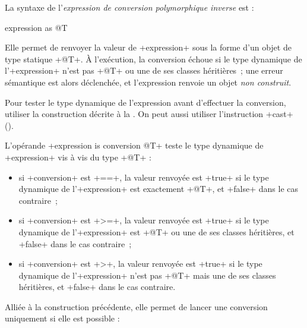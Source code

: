 
La syntaxe de l'\emph{expression de conversion polymorphique inverse} est :

\begin{galgas3box}
expression as @T
\end{galgas3box}

Elle permet de renvoyer la valeur de \ggst+expression+ sous la forme d'un objet de type statique \ggst+@T+. À l'exécution, la conversion échoue si le type dynamique de l'\ggst+expression+ n'est pas \ggst+@T+ ou une de ses classes héritières~; une erreur sémantique est alors déclenchée, et l'expression renvoie un objet \emph{non construit}.

Pour tester le type dynamique de l'expression avant d'effectuer la conversion, utiliser la construction décrite à la . On peut aussi utiliser l'instruction \ggst+cast+ ().








L'opérande \ggst+expression is conversion @T+ teste le type dynamique de \ggst+expression+ vis à vis du type \ggst+@T+ :
\begin{itemize}
\item si \ggst+conversion+ est \ggst+==+, la valeur renvoyée est \ggst+true+ si le type dynamique de l'\ggst+expression+ est exactement \ggst+@T+, et \ggst+false+ dans le cas contraire~;
\item si \ggst+conversion+ est  \ggst+>=+, la valeur renvoyée est \ggst+true+ si le type dynamique de l'\ggst+expression+ est \ggst+@T+ ou une de ses classes héritières, et \ggst+false+ dans le cas contraire~;
\item si \ggst+conversion+ est  \ggst+>+, la valeur renvoyée est \ggst+true+ si le type dynamique de l'\ggst+expression+ n'est pas \ggst+@T+ mais une de ses classes héritières, et \ggst+false+ dans le cas contraire.
\end{itemize}



Alliée à la construction précédente, elle permet de lancer une conversion uniquement si elle est possible :

